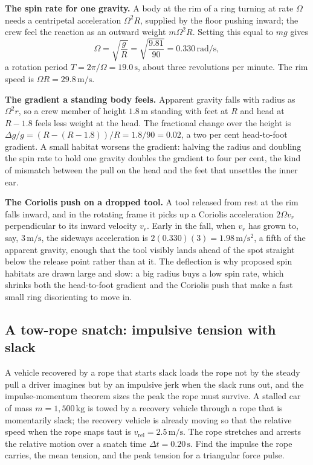 \textbf{The spin rate for one gravity.} A body at the rim of a ring
turning at rate $\Omega$ needs a centripetal acceleration $\Omega^{2}R$,
supplied by the floor pushing inward; the crew feel the reaction as an
outward weight $m\Omega^{2}R$. Setting this equal to $mg$ gives
\[
\Omega=\sqrt{\frac{g}{R}}=\sqrt{\frac{9.81}{90}}=0.330\,\si{\radian\per
\second},
\]
a rotation period $T=2\pi/\Omega=19.0\,\si{\second}$, about three
revolutions per minute. The rim speed is $\Omega R=29.8\,\si{\meter\per
\second}$.

\textbf{The gradient a standing body feels.} Apparent gravity falls with
radius as $\Omega^{2}r$, so a crew member of height $1.8\,\si{\meter}$
standing with feet at $R$ and head at $R-1.8$ feels less weight at the
head. The fractional change over the height is $\Delta g/g=(R-(R-1.8))/R
=1.8/90=0.02$, a two per cent head-to-foot gradient. A small habitat
worsens the gradient: halving the radius and doubling the spin rate to
hold one gravity doubles the gradient to four per cent, the kind of
mismatch between the pull on the head and the feet that unsettles the
inner ear.

\textbf{The Coriolis push on a dropped tool.} A tool released from rest
at the rim falls inward, and in the rotating frame it picks up a
Coriolis acceleration $2\Omega v_{r}$ perpendicular to its inward
velocity $v_{r}$. Early in the fall, when $v_{r}$ has grown to, say,
$3\,\si{\meter\per\second}$, the sideways acceleration is $2(0.330)(3)=
1.98\,\si{\meter\per\second\squared}$, a fifth of the apparent gravity,
enough that the tool visibly lands ahead of the spot straight below the
release point rather than at it. The deflection is why proposed spin
habitats are drawn large and slow: a big radius buys a low spin rate,
which shrinks both the head-to-foot gradient and the Coriolis push that
make a fast small ring disorienting to move in.

\subsection{A tow-rope snatch: impulsive tension with slack}

A vehicle recovered by a rope that starts slack loads the rope not by
the steady pull a driver imagines but by an impulsive jerk when the
slack runs out, and the impulse-momentum theorem sizes the peak the rope
must survive. A stalled car of mass $m=1{,}500\,\si{\kilogram}$ is towed
by a recovery vehicle through a rope that is momentarily slack; the
recovery vehicle is already moving so that the relative speed when the
rope snaps taut is $v_{\text{rel}}=2.5\,\si{\meter\per\second}$. The rope
stretches and arrests the relative motion over a snatch time
$\Delta t=0.20\,\si{\second}$. Find the impulse the rope carries, the
mean tension, and the peak tension for a triangular force pulse.

